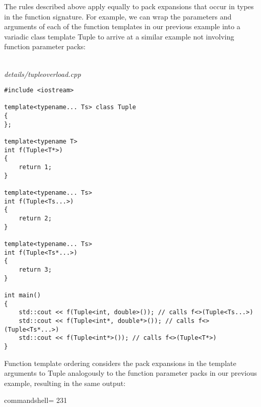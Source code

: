 The rules described above apply equally to pack expansions that occur in types in the function signature. For example, we can wrap the parameters and arguments of each of the function templates in our previous example into a variadic class template Tuple to arrive at a similar example not involving function parameter packs:

\hspace*{\fill} \\ %
\noindent
\textit{details/tupleoverload.cpp}
\begin{lstlisting}[style=styleCXX]
#include <iostream>

template<typename... Ts> class Tuple
{
};

template<typename T>
int f(Tuple<T*>)
{
	return 1;
}

template<typename... Ts>
int f(Tuple<Ts...>)
{
	return 2;
}

template<typename... Ts>
int f(Tuple<Ts*...>)
{
	return 3;
}

int main()
{
	std::cout << f(Tuple<int, double>()); // calls f<>(Tuple<Ts...>)
	std::cout << f(Tuple<int*, double*>()); // calls f<>(Tuple<Ts*...>)
	std::cout << f(Tuple<int*>()); // calls f<>(Tuple<T*>)
}
\end{lstlisting}

Function template ordering considers the pack expansions in the template arguments to Tuple analogously to the function parameter packs in our previous example, resulting in the same output:

\begin{tcblisting}{commandshell={}}
231
\end{tcblisting}





















